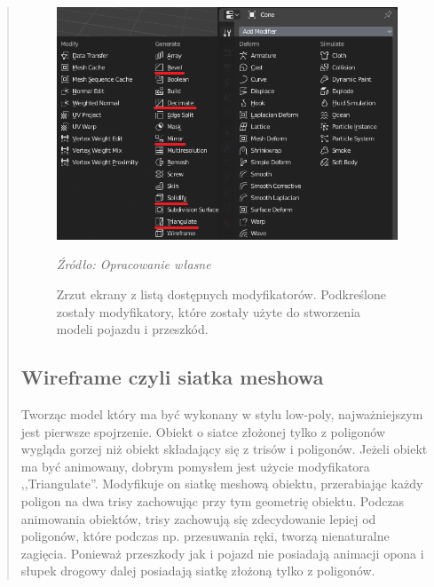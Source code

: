 \begin{quotation}
\begin{figure}[!hbt]
\centering
  \includegraphics[width=1\linewidth]{modyfikatory.png}
  \caption{Zrzut ekrany z listą dostępnych modyfikatorów. Podkreślone zostały modyfikatory, które zostały użyte do stworzenia modeli pojazdu i przeszkód.}\label{rys_8}
  \begin{minipage}[t]{0.75\linewidth}
    \emph{Źródło: Opracowanie własne}
  \end{minipage}
\end{figure}

\subsection{Wireframe czyli siatka meshowa}
\indent Tworząc model który ma być wykonany w stylu low-poly, najważniejszym jest pierwsze spojrzenie. Obiekt o siatce złożonej tylko z poligonów wygląda gorzej niż obiekt składający się z trisów i poligonów. Jeżeli obiekt ma być animowany, dobrym pomysłem jest użycie modyfikatora ,,Triangulate''. Modyfikuje on siatkę meshową obiektu, przerabiając każdy poligon na dwa trisy zachowując przy tym geometrię obiektu. Podczas animowania obiektów, trisy zachowują się zdecydowanie lepiej od poligonów, które podczas np. przesuwania ręki, tworzą nienaturalne zagięcia. Ponieważ przeszkody jak i pojazd nie posiadają animacji opona i słupek drogowy dalej posiadają siatkę złożoną tylko z poligonów.


\end{quotation}
